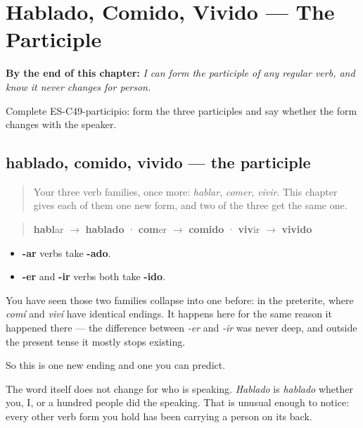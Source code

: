
\chapter{Hablado, Comido, Vivido --- The Participle}
\label{ch:participle}

\begin{chapteropening}
\textbf{By the end of this chapter:} \emph{I can form the participle of any regular verb, and know it never changes for person.}

Complete ES-C49-participio: form the three participles and say whether the form changes with the speaker.
\end{chapteropening}

\section[hablado / comido / vivido]{hablado, comido, vivido — the participle}

\label{lesson:ES-C49-participio}



\begin{quote}
Your three verb families, once more: \emph{hablar}, \emph{comer}, \emph{vivir}. This chapter gives each of them one new form, and two of the three get the same one.
\end{quote}

\begin{grammarlens}[title={Grammar Lens: two endings, not three}]
\begin{quote}
\textbf{habl}ar $\to$ \textbf{hablado} · \textbf{com}er $\to$ \textbf{comido} · \textbf{viv}ir $\to$ \textbf{vivido}
\end{quote}

\begin{itemize}
\raggedright
  \item \textbf{-ar} verbs take \textbf{-ado}.
  \item \textbf{-er} and \textbf{-ir} verbs both take \textbf{-ido}.
\end{itemize}

You have seen those two families collapse into one before: in the preterite, where \emph{comí} and \emph{viví} have identical endings. It happens here for the same reason it happened there — the difference between \emph{-er} and \emph{-ir} was never deep, and outside the present tense it mostly stops existing.

So this is one new ending and one you can predict.

The word itself does not change for who is speaking. \emph{Hablado} is \emph{hablado} whether you, I, or a hundred people did the speaking. That is unusual enough to notice: every other verb form you hold has been carrying a person on its back.
\end{grammarlens}


